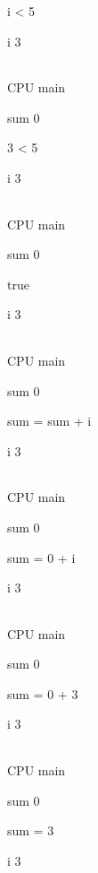 \documentclass[
]{article}
\begin{document}
i \textless{} 5

i 3

\begin{longtable}[]{@{}@{}}
\toprule
\endhead
\bottomrule
\end{longtable}

CPU main

sum 0

3 \textless{} 5

i 3

\begin{longtable}[]{@{}@{}}
\toprule
\endhead
\bottomrule
\end{longtable}

CPU main

sum 0

true

i 3

\begin{longtable}[]{@{}@{}}
\toprule
\endhead
\bottomrule
\end{longtable}

CPU main

sum 0

sum = sum + i

i 3

\begin{longtable}[]{@{}@{}}
\toprule
\endhead
\bottomrule
\end{longtable}

CPU main

sum 0

sum = 0 + i

i 3

\begin{longtable}[]{@{}@{}}
\toprule
\endhead
\bottomrule
\end{longtable}

CPU main

sum 0

sum = 0 + 3

i 3

\begin{longtable}[]{@{}@{}}
\toprule
\endhead
\bottomrule
\end{longtable}

CPU main

sum 0

sum = 3

i 3

\begin{longtable}[]{@{}@{}}
\toprule
\endhead
\bottomrule
\end{longtable}
\end{document}
